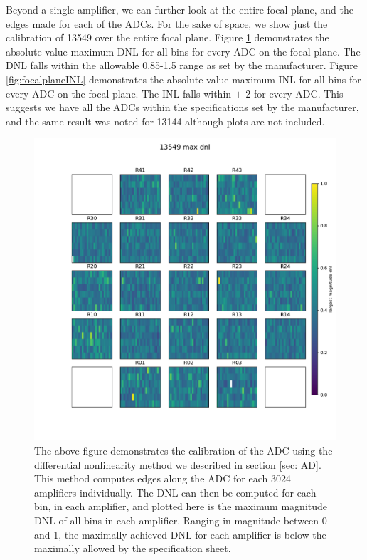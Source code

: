 \documentclass[11pt, letterpaper]{article}
\begin{document}
Beyond a single amplifier, we can further look at the entire focal plane, and the edges made for each of the ADCs. 
For the sake of space, we show just the calibration of 13549 over the entire focal plane. 
Figure \ref{fig:focalplaneDNL} demonstrates the absolute value maximum DNL for all bins for every ADC on the focal plane. 
The DNL falls within the allowable 0.85-1.5 range as set by the manufacturer.  
Figure \ref{fig:focalplaneINL} demonstrates the absolute value maximum INL for all bins for every ADC on the focal plane. 
The INL falls within $\pm$ 2 for every ADC. 
This suggests we have all the ADCs within the specifications set by the manufacturer, and the same result was noted for 13144 although plots are not included. 

\begin{figure}
    \centering
    \includegraphics[width=0.5\linewidth]{maxdnlplot.pdf}
    \caption{The above figure demonstrates the calibration of the ADC using the differential nonlinearity method we described in section \ref{sec: AD}. This method computes edges along the ADC for each 3024 amplifiers individually. The DNL can then be computed for each bin, in each amplifier, and plotted here is the maximum magnitude DNL of all bins in each amplifier. Ranging in magnitude between 0 and 1, the maximally achieved DNL for each amplifier is below the maximally allowed by the specification sheet.}
    \label{fig:focalplaneDNL}

\end{figure}
\end{document}
